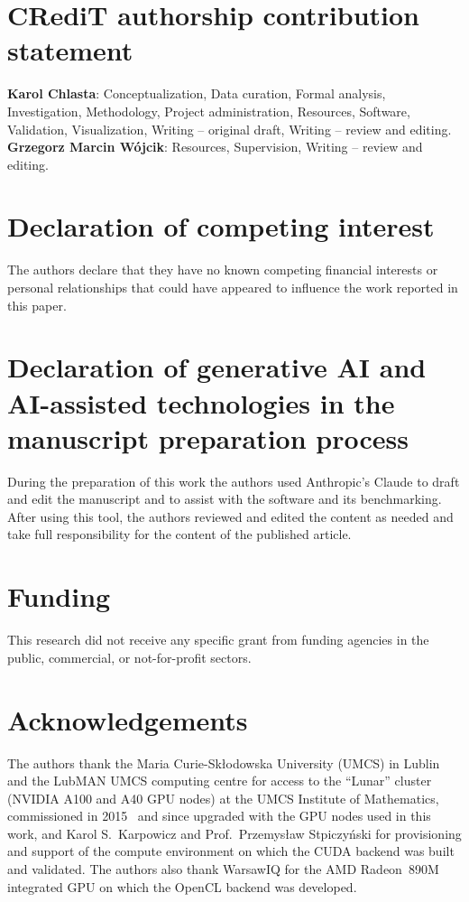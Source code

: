\documentclass[preprint,12pt, a4paper]{elsarticle}
\begin{document}
\section*{CRediT authorship contribution statement}

\textbf{Karol Chlasta}: Conceptualization, Data curation, Formal analysis,
Investigation, Methodology, Project administration, Resources, Software,
Validation, Visualization, Writing -- original draft, Writing -- review and
editing.
\textbf{Grzegorz Marcin W\'ojcik}: Resources, Supervision,
Writing -- review and editing.

\section*{Declaration of competing interest}

The authors declare that they have no known competing financial interests or
personal relationships that could have appeared to influence the work reported
in this paper.

\section*{Declaration of generative AI and AI-assisted technologies in the manuscript preparation process}

During the preparation of this work the authors used Anthropic's Claude to draft and edit the manuscript and to assist with the software and its benchmarking. After using this tool, the authors reviewed and edited the content as needed and take full responsibility for the content of the published article.

\section*{Funding}

This research did not receive any specific grant from funding agencies in the
public, commercial, or not-for-profit sectors.

\section*{Acknowledgements}

The authors thank the Maria Curie-Sk\l{}odowska University (UMCS) in Lublin and
the LubMAN UMCS computing centre for access to the ``Lunar'' cluster (NVIDIA A100
and A40 GPU nodes) at the UMCS Institute of Mathematics, commissioned in
2015~\cite{umcs_lunar2015} and since upgraded with the GPU nodes used in this
work, and Karol S.~Karpowicz and Prof.~Przemys\l{}aw Stpiczy\'nski
for provisioning and support of the compute environment on which the CUDA backend
was built and validated. The authors also thank WarsawIQ for the AMD Radeon~890M
integrated GPU on which the OpenCL backend was developed.
\end{document}
